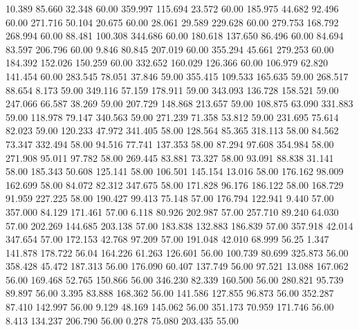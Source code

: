   10.389   85.660   32.348        60.00
 359.997  115.694   23.572        60.00
 185.975   44.682   92.496        60.00
 271.716   50.104   20.675        60.00
  28.061   29.589  229.628        60.00
 279.753  168.792  268.994        60.00
  88.481  100.308  344.686        60.00
 180.618  137.650   86.496        60.00
  84.694   83.597  206.796        60.00
   9.846   80.845  207.019        60.00
 355.294   45.661  279.253        60.00
 184.392  152.026  150.259        60.00
 332.652  160.029  126.366        60.00
 106.979   62.820  141.454        60.00
 283.545   78.051   37.846        59.00
 355.415  109.533  165.635        59.00
 268.517   88.654    8.173        59.00
 349.116   57.159  178.911        59.00
 343.093  136.728  158.521        59.00
 247.066   66.587   38.269        59.00
 207.729  148.868  213.657        59.00
 108.875   63.090  331.883        59.00
 118.978   79.147  340.563        59.00
 271.239   71.358   53.812        59.00
 231.695   75.614   82.023        59.00
 120.233   47.972  341.405        58.00
 128.564   85.365  318.113        58.00
  84.562   73.347  332.494        58.00
  94.516   77.741  137.353        58.00
  87.294   97.608  354.984        58.00
 271.908   95.011   97.782        58.00
 269.445   83.881   73.327        58.00
  93.091   88.838   31.141        58.00
 185.343   50.608  125.141        58.00
 106.501  145.154   13.016        58.00
 176.162   98.009  162.699        58.00
  84.072   82.312  347.675        58.00
 171.828   96.176  186.122        58.00
 168.729   91.959  227.225        58.00
 190.427   99.413   75.148        57.00
 176.794  122.941    9.440        57.00
 357.000   84.129  171.461        57.00
   6.118   80.926  202.987        57.00
 257.710   89.240   64.030        57.00
 202.269  144.685  203.138        57.00
 183.838  132.883  186.839        57.00
 357.918   42.014  347.654        57.00
 172.153   42.768   97.209        57.00
 191.048   42.010   68.999        56.25
   1.347  141.878  178.722        56.04
 164.226   61.263  126.601        56.00
 100.739   80.699  325.873        56.00
 358.428   45.472  187.313        56.00
 176.090   60.407  137.749        56.00
  97.521   13.088  167.062        56.00
 169.468   52.765  150.866        56.00
 346.230   82.339  160.500        56.00
 280.821   95.739   89.897        56.00
   3.395   83.888  168.362        56.00
 141.586  127.855   96.873        56.00
 352.287   87.410  142.997        56.00
   9.129   48.169  145.062        56.00
 351.173   70.959  171.746        56.00
   8.413  134.237  206.790        56.00
   0.278   75.080  203.435        55.00
